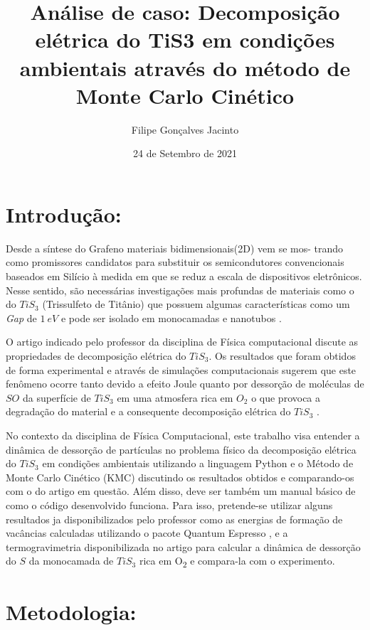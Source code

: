 \documentclass[11pt]{article}
\author{Filipe Gonçalves Jacinto}
\date{24 de Setembro de 2021}
\title{Análise de caso: Decomposição elétrica do TiS3 em condições ambientais através do método de Monte Carlo Cinético}
\begin{document}
\maketitle
\tableofcontents




\section{Introdução:}
\label{sec:org66f42fb}
Desde a síntese do Grafeno \cite{geim2010rise} materiais bidimensionais(2D) vem se mos- \linebreak trando como promissores candidatos para substituir os semicondutores convencionais baseados em Silício à medida em que se reduz a escala de dispositivos eletrônicos. Nesse sentido, são necessárias investigações mais profundas de materiais como o do \(TiS_3\) (Trissulfeto de Titânio) que possuem algumas características como um  \textit{Gap} de \(1~eV\) e pode ser isolado em monocamadas e nanotubos \cite{molina2017high}.

O artigo indicado pelo professor da disciplina de Física computacional \cite{molina2017high} discute as propriedades de decomposição elétrica do \(TiS_3\). Os resultados que foram obtidos de forma experimental e através de simulações computacionais sugerem que este fenômeno ocorre tanto devido a efeito Joule quanto por dessorção de moléculas de \(SO\) da superfície de \(TiS_3\) em uma atmosfera rica em \(O_2\) o que provoca a degradação do material e a consequente decomposição elétrica do \(TiS_3\) .

No contexto da disciplina de Física Computacional, este trabalho visa entender a dinâmica de dessorção de partículas no problema físico da decomposição elétrica do \(TiS_3\) em condições ambientais utilizando a linguagem Python e o Método de Monte Carlo Cinético (KMC) discutindo os resultados obtidos e comparando-os com o do artigo em questão\cite{molina2017high}. Além disso, deve ser também um manual básico de como o código desenvolvido funciona. Para isso, pretende-se utilizar alguns resultados ja disponibilizados pelo professor como as energias de formação de vacâncias calculadas utilizando o pacote Quantum Espresso\cite{giannozzi2009quantum} , e a termogravimetria disponibilizada no artigo\cite{molina2017high} para calcular a dinâmica de dessorção do \(S\) da monocamada de \(TiS_3\) rica em O\textsubscript{2} e compara-la com o experimento.


\section{Metodologia:}
\label{sec:org1f4cfe7}
\end{document}
